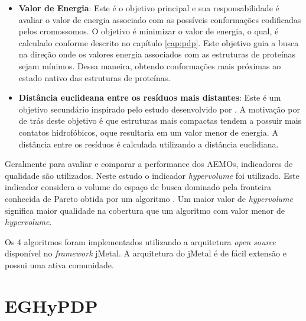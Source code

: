 \begin{itemize}
	\item \textbf{Valor de Energia}: Este é o objetivo principal e sua responsabilidade é avaliar o valor de energia associado com as possíveis conformações codificadas pelos cromossomos. O objetivo é minimizar o valor de energia, o qual, é calculado conforme descrito no capítulo \ref{cap:pdp}. Este objetivo guia a busca na direção onde os valores energia associados com as estruturas de proteínas sejam mínimos. Dessa maneira, obtendo conformações mais próximas ao estado nativo das estruturas de proteínas.

    \item \textbf{Distância euclideana entre os resíduos mais distantes}: Este é um objetivo secundário inspirado pelo estudo desenvolvido por \cite{gabriel2012algoritmos}. A motivação por de trás deste objetivo é que estruturas mais compactas tendem a possuir mais contatos hidrofóbicos, oque resultaria em um valor menor de energia. A distância entre os resíduos é calculada utilizando a distância euclidiana.
   
\end{itemize}

Geralmente para avaliar e comparar a performance dos AEMOs, indicadores de qualidade são utilizados. Neste estudo o indicador \textit{hypervolume} foi utilizado. Este indicador considera o volume do espaço de busca dominado pela fronteira conhecida de Pareto obtida por um algoritmo \cite{zitzler2003performance}. Um maior valor de \textit{hypervolume} significa maior qualidade na cobertura que um algoritmo com valor menor de \textit{hypervolume}.

Os 4 algoritmos foram implementados utilizando a arquitetura \textit{open source} disponível no \textit{framework} jMetal. A arquitetura do jMetal é de fácil extensão e possui uma ativa comunidade.


\section{EGHyPDP}
\label{sec:eghypdp}

